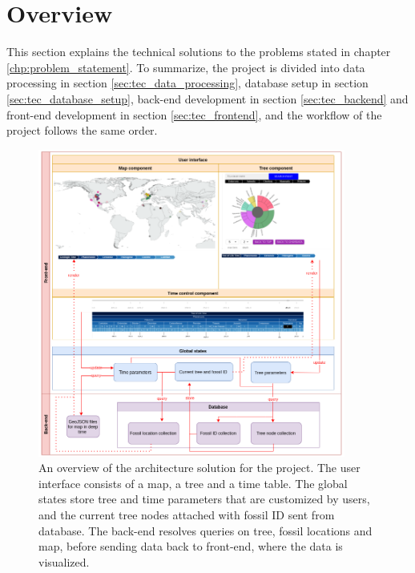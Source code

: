 \documentclass[11pt, a4paper,oneside,chapterprefix=false]{scrbook}
\begin{document}
\section{Overview}\label{sec:tec_overview}
This section explains the technical solutions to the problems stated in chapter \ref{chp:problem_statement}. To summarize, the project is divided into data processing in section \ref{sec:tec_data_processing}, database setup in section \ref{sec:tec_database_setup}, back-end development in section \ref{sec:tec_backend} and front-end development in section \ref{sec:tec_frontend}, and the workflow of the project follows the same order. 

\begin{figure}[h]
	\centering
	\includegraphics[width=0.9\textwidth]{figures/technical_solution/architecture}
	\caption{An overview of the architecture solution for the project. The user interface consists of a map, a tree and a time table. The global states store tree and time parameters that are customized by users, and the current tree nodes attached with fossil ID sent from database. The back-end resolves queries on tree, fossil locations and map, before sending data back to front-end, where the data is visualized. }
	\label{fig:architecture}
\end{figure}
\end{document}
